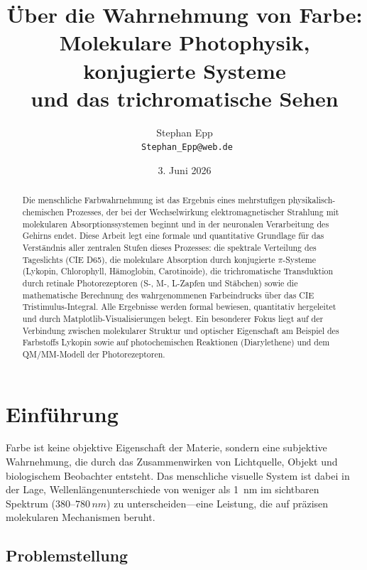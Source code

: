 ﻿\documentclass[a4paper,12pt]{article}
\title{\textbf{Über die Wahrnehmung von Farbe:\\
Molekulare Photophysik, konjugierte Systeme\\
und das trichromatische Sehen}}
\author{Stephan Epp\\
\
\small \texttt{Stephan\_Epp@web.de}}
\date{3. Juni 2026}
\theoremstyle{definition}
\begin{document}
\maketitle

\begin{abstract}
Die menschliche Farbwahrnehmung ist das Ergebnis eines mehrstufigen physikalisch-chemischen Prozesses,
der bei der Wechselwirkung elektromagnetischer Strahlung mit molekularen Absorptionssystemen beginnt
und in der neuronalen Verarbeitung des Gehirns endet. Diese Arbeit legt eine formale und
quantitative Grundlage für das Verständnis aller zentralen Stufen dieses Prozesses:
die spektrale Verteilung des Tageslichts (CIE D65), die molekulare Absorption durch
konjugierte $\pi$-Systeme (Lykopin, Chlorophyll, Hämoglobin, Carotinoide),
die trichromatische Transduktion durch retinale Photorezeptoren (S-, M-, L-Zapfen und Stäbchen)
sowie die mathematische Berechnung des wahrgenommenen Farbeindrucks über das
CIE Tristimulus-Integral. Alle Ergebnisse werden formal bewiesen, quantitativ hergeleitet
und durch Matplotlib-Visualisierungen belegt. Ein besonderer Fokus liegt auf der Verbindung
zwischen molekularer Struktur und optischer Eigenschaft am Beispiel des Farbstoffs Lykopin
sowie auf photochemischen Reaktionen (Diarylethene) und dem QM/MM-Modell der Photorezeptoren.
\end{abstract}

\tableofcontents
\newpage

\section{Einführung}

Farbe ist keine objektive Eigenschaft der Materie, sondern eine subjektive Wahrnehmung,
die durch das Zusammenwirken von Lichtquelle, Objekt und biologischem Beobachter entsteht.
Das menschliche visuelle System ist dabei in der Lage, Wellenlängenunterschiede von weniger
als \SI{1}{nm} im sichtbaren Spektrum ($380$--$780\,\si{nm}$) zu unterscheiden---eine Leistung,
die auf präzisen molekularen Mechanismen beruht.

\subsection{Problemstellung}
\end{document}

